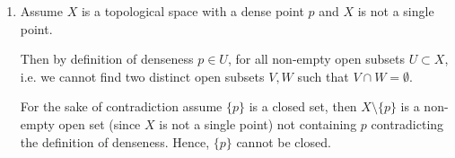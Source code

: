 \documentclass[Notebook.tex]{subfiles}
\begin{document}
\begin{solution}
\begin{enumerate}[label=(\alph*),ref=\theenumi\alph*]
\begin{enumerate}[label=(\roman*), ref=\theenumi\roman*]
            \item Since $\Z$ is a PID, points of $\mSpec(\Z)$ are maximal ideals $\langle p \rangle$ where $p \in \Z$ prime. 
            Since $\V(p) = \langle p \rangle$, $[f]$ is not dense in $\Spec(\Z)$. 

            \item For every non-zero $[P] \in \mSpec(\Z[t])$, $\V(P) = \{[P]\}$. Hence, $[P]$ is not dense. 
            
            \item $\mSpec(\K[x]/\langle x^{2}\rangle) = \{\langle x \rangle\}$. Hence $[x]$ is trivially dense in $\mSpec(\K[x]/\langle x^{2}\rangle)$. 
            
            \item For every maximal ideal $[P] \in \mSpec(\K[x,y])$, $\V(P) =\{[P]\} \neq \mSpec(\K[x,y])$. Hence, $[P]$ is not dense. 

            \item $\mSpec(\Z/\langle 6\rangle) = \{\langle 2 \rangle, \langle 3 \rangle\}$. Since $\V([2])$ doesn't contain $[3]$ and $\V([3])$ doesn't contain $[2]$ there are no dense points in $\mSpec(\Z/\langle 6\rangle)$. 

            \item $\mSpec(\Z/\langle 4\rangle) = \{\langle 2 \rangle\}$. Hence $[2]$ is trivially dense. 

            \item $\mSpec(\Z/\langle 12\rangle) = \{\langle 2 \rangle, \langle 3 \rangle \}$. Since $\V([2])$ doesn't contain $[3]$ and $\V([3])$ doesn't contain $[2]$ there are no dense points in $\mSpec(\Z/\langle 12\rangle)$. 
        \end{enumerate}

        $\mSpec(R)$ only has dense points when it is a singleton set. 

        \item Assume $X$ is a topological space with a dense point $p$ and $X$ is not a single point.
        
        Then by definition of denseness $p \in U$, for all non-empty open subsets $U \subset X$, i.e. we cannot find two distinct open subsets $V, W$ such that $V \cap W = \emptyset$. 
        
        For the sake of contradiction assume $\{p\}$ is a closed set, then $X \setminus \{p\}$ is a non-empty open set (since $X$ is not a single point) not containing $p$ contradicting the definition of denseness. Hence, $\{p\}$ cannot be closed. 
    \end{enumerate}
\end{solution}
\end{document}
